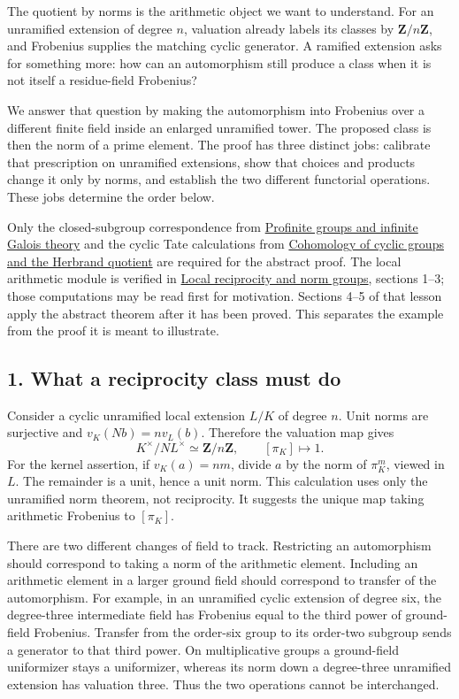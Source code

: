 \documentclass[11pt,a4paper]{article}
\begin{document}
The quotient by norms is the arithmetic object we want to understand.
For an unramified extension of degree \(n\), valuation already labels
its classes by \(\mathbf Z/n\mathbf Z\), and Frobenius supplies the
matching cyclic generator. A ramified extension asks for something more:
how can an automorphism still produce a class when it is not itself a
residue-field Frobenius?

We answer that question by making the automorphism into Frobenius over a
different finite field inside an enlarged unramified tower. The proposed
class is then the norm of a prime element. The proof has three distinct
jobs: calibrate that prescription on unramified extensions, show that
choices and products change it only by norms, and establish the two
different functorial operations. These jobs determine the order below.

Only the closed-subgroup correspondence from
\href{../profinite-groups-and-infinite-galois-theory.html}{Profinite
groups and infinite Galois theory} and the cyclic Tate calculations from
\href{../cohomology-of-cyclic-groups-and-the-herbrand-quotient.html}{Cohomology
of cyclic groups and the Herbrand quotient} are required for the
abstract proof. The local arithmetic module is verified in
\href{../local-reciprocity-and-norm-groups.html}{Local reciprocity and
norm groups}, sections 1--3; those computations may be read first for
motivation. Sections 4--5 of that lesson apply the abstract theorem
after it has been proved. This separates the example from the proof it
is meant to illustrate.

\subsection{1. What a reciprocity class must
do}\label{what-a-reciprocity-class-must-do}

Consider a cyclic unramified local extension \(L/K\) of degree \(n\).
Unit norms are surjective and \(v_K(Nb)=n v_L(b)\). Therefore the
valuation map gives \[
K^\times/NL^\times\simeq\mathbf Z/n\mathbf Z,
\qquad [\pi_K]\longmapsto1.
\] For the kernel assertion, if \(v_K(a)=nm\), divide \(a\) by the norm
of \(\pi_K^m\), viewed in \(L\). The remainder is a unit, hence a unit
norm. This calculation uses only the unramified norm theorem, not
reciprocity. It suggests the unique map taking arithmetic Frobenius to
\([\pi_K]\).

There are two different changes of field to track. Restricting an
automorphism should correspond to taking a norm of the arithmetic
element. Including an arithmetic element in a larger ground field should
correspond to transfer of the automorphism. For example, in an
unramified cyclic extension of degree six, the degree-three intermediate
field has Frobenius equal to the third power of ground-field Frobenius.
Transfer from the order-six group to its order-two subgroup sends a
generator to that third power. On multiplicative groups a ground-field
uniformizer stays a uniformizer, whereas its norm down a degree-three
unramified extension has valuation three. Thus the two operations cannot
be interchanged.
\end{document}
